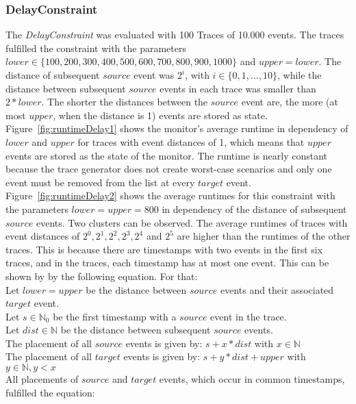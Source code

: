 \subsubsection{DelayConstraint}
	The \textit{DelayConstraint} was evaluated with 100 Traces of 10.000 events. The traces fulfilled the constraint with the parameters $lower\in\{100, 200, 300, 400, 500, 600, 700, 800, 900, 1000\}$ and $upper=lower$.  The distance of subsequent $source$ event was $2^i$, with $i\in \{0, 1, ..., 10\}$, while the distance between subsequent $source$ events in each trace was smaller than $2*lower$. The shorter the distances between the $source$ event are, the more (at most $upper$, when the distance is 1) events are stored as state.\\
	Figure~\ref{fig:runtimeDelay1} shows the monitor's average runtime in dependency of $lower$ and $upper$ for traces with event distances of 1, which means that $upper$ events are stored as the state of the monitor. The runtime is nearly constant because the trace generator does not create worst-case scenarios and only one event must be removed from the list at every $target$ event.\\
	Figure~\ref{fig:runtimeDelay2} shows the average runtimes for this constraint with the parameters $lower=upper=800$ in dependency of the distance of subsequent $source$ events. Two clusters can be observed. The average runtimes of traces with event distances of $2^0, 2^1,2^2,2^3,2^4$ and $2^5$ are higher than the runtimes of the other traces. This is because there are timestamps with two events in the first six traces, and in the traces, each timestamp has at most one event. This can be shown by by the following equation. For that:\\
		Let $lower=upper$ be the distance between $source$ events and their associated $target$ event.\\
		Let $s\in\mathbb{N}_0$ be the first timestamp with a $source$ event in the trace.\\
		Let $dist\in\mathbb{N}$ be the distance between subsequent $source$ events.\\
		The placement of all $source$ events is given by: $s+x*dist$ with $x\in\mathbb N$\\
		The placement of all $target$ events is given by: $s+y*dist + upper$ with $y\in\mathbb N, y<x$\\
		All placements of $source$ and $target$ events, which occur in common timestamps, fulfilled the equation:\\
